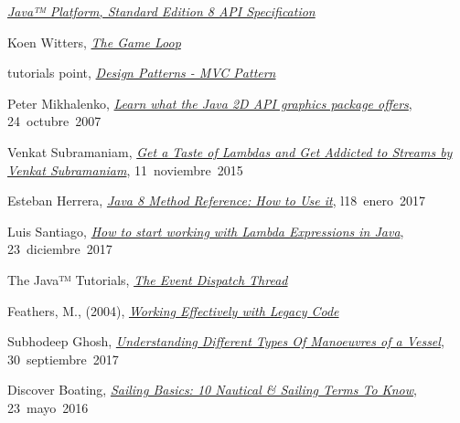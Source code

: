\href{https://docs.oracle.com/javase/8/docs/api/}{\textit{Java™ Platform, Standard Edition 8
		API Specification}}

Koen Witters,
\href{https://dewitters.com/dewitters-gameloop/}{\textit{The Game Loop}}

tutorials point,
\href{https://www.tutorialspoint.com/design_pattern/mvc_pattern.htm}{\textit{Design Patterns - MVC Pattern}}

Peter Mikhalenko,
\href{https://www.techrepublic.com/blog/software-engineer/learn-what-the-java-2d-api-graphics-package-offers/}{\textit{Learn what the Java 2D API graphics package offers}},
\mbox{24 octubre 2007}

Venkat Subramaniam,
\href{https://youtu.be/1OpAgZvYXLQ}{\textit{Get a Taste of Lambdas and Get Addicted to Streams by Venkat Subramaniam}},
\mbox{11 noviembre 2015}

Esteban Herrera,
\href{https://www.codementor.io/eh3rrera/using-java-8-method-reference-du10866vx}{\textit{Java 8 Method Reference: How to Use it}},
\mbox{l18 enero 2017}

Luis Santiago,
\href{https://www.freecodecamp.org/news/learn-these-4-things-and-working-with-lambda-expressions-b0ab36e0fffc/}{\textit{How to start working with Lambda Expressions in Java}},
\mbox{23 diciembre 2017}

The Java™ Tutorials,
\href{https://docs.oracle.com/javase/tutorial/uiswing/concurrency/dispatch.html}{\textit{The Event Dispatch Thread}}

Feathers, M., (2004),
\href{https://www.amazon.com/Working-Effectively-Legacy-Michael-Feathers/dp/0131177052}{\textit{Working Effectively with Legacy Code}}

Subhodeep Ghosh,
\href{https://www.marineinsight.com/naval-architecture/different-types-of-manoeuvres-of-a-vessel/}{\textit{Understanding Different Types Of Manoeuvres of a Vessel}},
\mbox{30 septiembre 2017}

Discover Boating,
\href{https://www.discoverboating.com/resources/sailing-basics-10-nautical-sailing-terms-to-know}{\textit{Sailing Basics: 10 Nautical \& Sailing Terms To Know}},
\mbox{23 mayo 2016}


